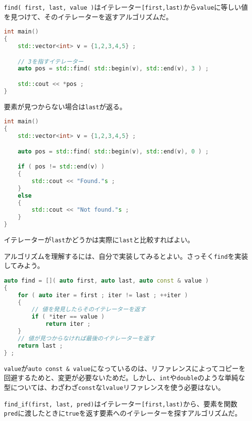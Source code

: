 
\texttt{find( first, last, value )}はイテレーター\texttt{[first,last)}から\texttt{value}に等しい値を見つけて、そのイテレーターを返すアルゴリズムだ。

\begin{lstlisting}[language={C++}]
int main()
{
    std::vector<int> v = {1,2,3,4,5} ;

    // 3を指すイテレーター
    auto pos = std::find( std::begin(v), std::end(v), 3 ) ;

    std::cout << *pos ;
}
\end{lstlisting}

要素が見つからない場合は\texttt{last}が返る。

\ifTombow\pagebreak\fi
\begin{lstlisting}[language={C++}]
int main()
{
    std::vector<int> v = {1,2,3,4,5} ;

    auto pos = std::find( std::begin(v), std::end(v), 0 ) ;

    if ( pos != std::end(v) )
    {
        std::cout << "Found."s ; 
    }
    else
    {
        std::cout << "Not found."s ;
    }
}
\end{lstlisting}

イテレーターが\texttt{last}かどうかは実際に\texttt{last}と比較すればよい。

アルゴリズムを理解するには、自分で実装してみるとよい。さっそく\texttt{find}を実装してみよう。

\begin{lstlisting}[language={C++}]
auto find = []( auto first, auto last, auto const & value )
{
    for ( auto iter = first ; iter != last ; ++iter )
    {
        // 値を発見したらそのイテレーターを返す
        if ( *iter == value )
            return iter ;
    }
    // 値が見つからなければ最後のイテレーターを返す
    return last ;
} ;
\end{lstlisting}

\texttt{value}が\texttt{auto const \& value}になっているのは、リファレンスによってコピーを回避するためと、変更が必要ないためだ。しかし、\texttt{int}や\texttt{double}のような単純な型については、わざわざ\texttt{const}な\texttt{lvalue}リファレンスを使う必要はない。

\texttt{find\_if(first, last, pred)}はイテレーター\texttt{[first,last)}から、要素を関数\texttt{pred}に渡したときに\texttt{true}を返す要素へのイテレーターを探すアルゴリズムだ。

